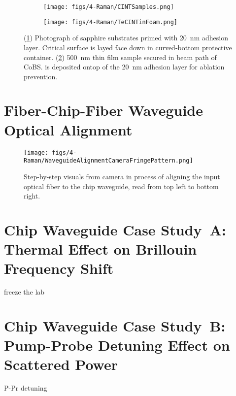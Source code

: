\begin{figure}[t]
    \centering
    \begin{subfigure}[b]{0.49\textwidth}
        \centering
        \texttt{[image: figs/4-Raman/CINTSamples.png]}
        \caption{}
        \label{fig:Raman:CINTSamplesFacedown}
    \end{subfigure}
    \hfill
    \begin{subfigure}[b]{0.49\textwidth}
        \centering
        \texttt{[image: figs/4-Raman/TeCINTinFoam.png]}
        \caption{}
        \label{fig:Raman:TeCINTinFoam}
    \end{subfigure}
    \caption{(\ref{fig:Raman:CINTSamplesFacedown}) Photograph of sapphire substrates primed with \SI{20}{\nano\meter}  adhesion layer. Critical surface is layed face down in curved-bottom protective container. (\ref{fig:Raman:TeCINTinFoam}) \SI{500}{\nano\meter}  thin film sample secured in beam path of \acl{CoBS}.  is deposited ontop of the \SI{20}{\nano\meter}  adhesion layer for ablation prevention.}
    \label{fig:Raman:CINTSamples}
\end{figure}

\section{Fiber-Chip-Fiber Waveguide Optical Alignment}
\label{Raman:Appendix:sec:WaveguideAlignment}

\begin{figure}[t]
  \centering
  \texttt{[image: figs/4-Raman/WaveguideAlignmentCameraFringePattern.png]}
  \caption{Step-by-step visuals from camera in process of aligning the input optical fiber to the chip waveguide, read from top left to bottom right.}
  \label{fig:Raman:WaveguideAlignmentCameraFringePattern}
\end{figure}

\section{Chip Waveguide Case Study~A: Thermal Effect on Brillouin Frequency Shift}
\label{Raman:Appendix:sec:CaseStudyAThermal}

freeze the lab

\section{Chip Waveguide Case Study~B: Pump-Probe Detuning Effect on Scattered Power}
\label{Raman:Appendix:sec:CaseStudyBDetuning}

P-Pr detuning
